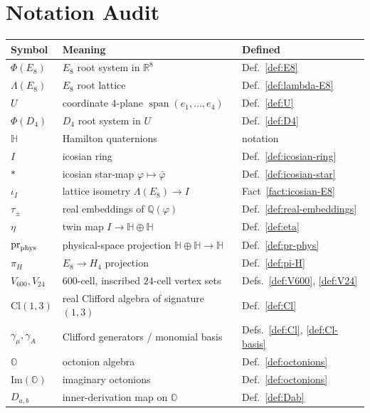 \documentclass[11pt, a4paper]{amsart}
\theoremstyle{definition}
\newcommand{\R}{\mathbb{R}}
\newcommand{\Q}{\mathbb{Q}}
\newcommand{\HH}{\mathbb{H}}
\newcommand{\OO}{\mathbb{O}}
\newcommand{\Cl}{\mathrm{Cl}}
\renewcommand{\Im}{\mathrm{Im}}
\begin{document}
\appendix

\section{Notation Audit}
\label{app:notation}

\begin{center}
\begin{tabular}{lll}
\hline
Symbol & Meaning & Defined \\
\hline
$\Phi(E_8)$ & $E_8$ root system in $\R^8$ & Def.~\ref{def:E8} \\
$\Lambda(E_8)$ & $E_8$ root lattice & Def.~\ref{def:lambda-E8} \\
$U$ & coordinate $4$-plane $\operatorname{span}(e_1, \ldots, e_4)$ & Def.~\ref{def:U} \\
$\Phi(D_4)$ & $D_4$ root system in $U$ & Def.~\ref{def:D4} \\
$\HH$ & Hamilton quaternions & notation \\
$I$ & icosian ring & Def.~\ref{def:icosian-ring} \\
$\ast$ & icosian star-map $\varphi \mapsto \bar\varphi$ & Def.~\ref{def:icosian-star} \\
$\iota_I$ & lattice isometry $\Lambda(E_8) \to I$ & Fact~\ref{fact:icosian-E8} \\
$\tau_\pm$ & real embeddings of $\Q(\varphi)$ & Def.~\ref{def:real-embeddings} \\
$\eta$ & twin map $I \to \HH \oplus \HH$ & Def.~\ref{def:eta} \\
$\operatorname{pr}_{\rm phys}$ & physical-space projection $\HH \oplus \HH \to \HH$ & Def.~\ref{def:pr-phys} \\
$\pi_H$ & $E_8 \to H_4$ projection & Def.~\ref{def:pi-H} \\
$V_{600}, V_{24}$ & $600$-cell, inscribed $24$-cell vertex sets & Defs.~\ref{def:V600}, \ref{def:V24} \\
$\Cl(1,3)$ & real Clifford algebra of signature $(1,3)$ & Def.~\ref{def:Cl} \\
$\gamma_\mu, \gamma_A$ & Clifford generators / monomial basis & Defs.~\ref{def:Cl}, \ref{def:Cl-basis} \\
$\OO$ & octonion algebra & Def.~\ref{def:octonions} \\
$\Im(\OO)$ & imaginary octonions & Def.~\ref{def:octonions} \\
$D_{a,b}$ & inner-derivation map on $\OO$ & Def.~\ref{def:Dab} \\

\end{tabular}
\end{center}
\end{document}
